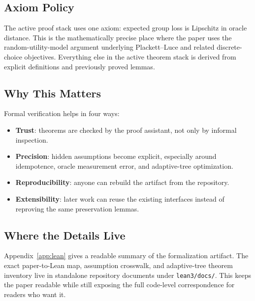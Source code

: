 \subsection{Axiom Policy}

The active proof stack uses one axiom: expected group loss is Lipschitz in
oracle distance. This is the mathematically precise place where the paper uses
the random-utility-model argument underlying Plackett--Luce and related
discrete-choice objectives. Everything else in the active theorem stack is
derived from explicit definitions and previously proved lemmas.

\subsection{Why This Matters}

Formal verification helps in four ways:
\begin{itemize}[nosep]
    \item \textbf{Trust}: theorems are checked by the proof assistant, not only by informal inspection.
    \item \textbf{Precision}: hidden assumptions become explicit, especially around idempotence, oracle measurement error, and adaptive-tree optimization.
    \item \textbf{Reproducibility}: anyone can rebuild the artifact from the repository.
    \item \textbf{Extensibility}: later work can reuse the existing interfaces instead of reproving the same preservation lemmas.
\end{itemize}

\subsection{Where the Details Live}

Appendix~\ref{app:lean} gives a readable summary of the formalization artifact.
The exact paper-to-Lean map, assumption crosswalk, and adaptive-tree theorem
inventory live in standalone repository documents under \texttt{lean3/docs/}.
This keeps the paper readable while still exposing the full code-level
correspondence for readers who want it.
